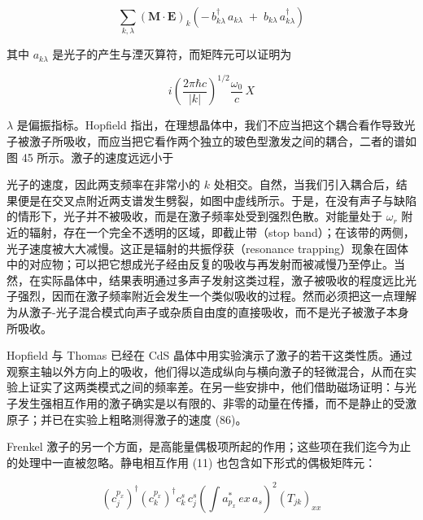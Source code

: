 \begin{equation*}
\sum_{k,\lambda} \left(\mathbf{M}\cdot\mathbf{E}\right)_{k} \left(-\, b_{k\lambda}^{\dagger}\, a_{k\lambda} \;+\; b_{k\lambda}\, a_{k\lambda}^{\dagger}\right)
\end{equation*}

其中 $a_{k\lambda}$ 是光子的产生与湮灭算符，而矩阵元可以证明为

\begin{equation*}
i\left(\frac{2\pi\hbar c}{|k|}\right)^{1/2} \frac{\omega_0}{c}\, X
\end{equation*}

$\lambda$ 是偏振指标。Hopfield 指出，在理想晶体中，我们不应当把这个耦合看作导致光子被激子所吸收，而应当把它看作两个独立的玻色型激发之间的耦合，二者的谱如图 45 所示。激子的速度远远小于


光子的速度，因此两支频率在非常小的 $k$ 处相交。自然，当我们引入耦合后，结果便是在交叉点附近两支谱发生劈裂，如图中虚线所示。于是，在没有声子与缺陷的情形下，光子并不被吸收，而是在激子频率处受到强烈色散。对能量处于 $\omega_r$ 附近的辐射，存在一个完全不透明的区域，即截止带（stop band）；在该带的两侧，光子速度被大大减慢。这正是辐射的共振俘获（resonance trapping）现象在固体中的对应物；可以把它想成光子经由反复的吸收与再发射而被减慢乃至停止。当然，在实际晶体中，结果表明通过多声子发射这类过程，激子被吸收的程度远比光子强烈，因而在激子频率附近会发生一个类似吸收的过程。然而必须把这一点理解为从激子-光子混合模式向声子或杂质自由度的直接吸收，而不是光子被激子本身所吸收。

Hopfield 与 Thomas 已经在 CdS 晶体中用实验演示了激子的若干这类性质。通过观察主轴以外方向上的吸收，他们得以造成纵向与横向激子的轻微混合，从而在实验上证实了这两类模式之间的频率差。在另一些安排中，他们借助磁场证明：与光子发生强相互作用的激子确实是以有限的、非零的动量在传播，而不是静止的受激原子；并已在实验上粗略测得激子的速度 (86)。

Frenkel 激子的另一个方面，是高能量偶极项所起的作用；这些项在我们迄今为止的处理中一直被忽略。静电相互作用 (11) 也包含如下形式的偶极矩阵元：

\begin{equation*}
\left(c_j^{p_x}\right)^{\dagger} \left(c_k^{p_x}\right)^{\dagger} c_k^{s}\, c_j^{s} \left(\int a_{p_x}^{*}\, ex\, a_s\right)^{2} \left(T_{jk}\right)_{xx}
\end{equation*}

